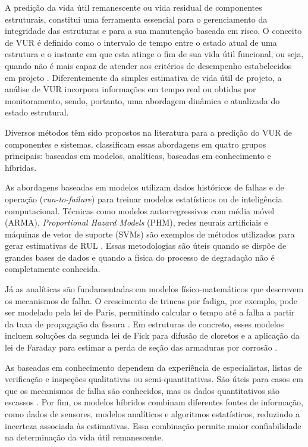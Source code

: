 A predição da vida útil remanescente ou vida residual de componentes estruturais, constitui uma ferramenta essencial para o gerenciamento da integridade das estruturas e para a sua manutenção baseada em risco. O conceito de VUR é definido como o intervalo de tempo entre o estado atual de uma estrutura e o instante em que esta atinge o fim de sua vida útil funcional, ou seja, quando não é mais capaz de atender aos critérios de desempenho estabelecidos em projeto \cite{okoh_overview_2014}. Diferentemente da simples estimativa de vida útil de projeto, a análise de VUR incorpora informações em tempo real ou obtidas por monitoramento, sendo, portanto, uma abordagem dinâmica e atualizada do estado estrutural.

Diversos métodos têm sido propostos na literatura para a predição do VUR de componentes e sistemas. \textcite{okoh_overview_2014} classificam essas abordagens em quatro grupos principais: baseadas em modelos, analíticas, baseadas em conhecimento e híbridas. 

As abordagens baseadas em modelos utilizam dados históricos de falhas e de operação (\textit{run-to-failure}) para treinar modelos estatísticos ou de inteligência computacional. Técnicas como modelos autorregressivos com média móvel (ARMA), \textit{Proportional Hazard Models} (PHM), redes neurais artificiais e máquinas de vetor de suporte (SVMs) são exemplos de métodos utilizados para gerar estimativas de RUL \cite{chen_clustering_1993, you_two-zone_2010}. Essas metodologias são úteis quando se dispõe de grandes bases de dados e quando a física do processo de degradação não é completamente conhecida.

Já as analíticas são fundamentadas em modelos físico-matemáticos que descrevem os mecanismos de falha. O crescimento de trincas por fadiga, por exemplo, pode ser modelado pela lei de Paris, permitindo calcular o tempo até a falha a partir da taxa de propagação da fissura \cite{fatemi_cumulative_1998}. Em estruturas de concreto, esses modelos incluem soluções da segunda lei de Fick para difusão de cloretos e a aplicação da lei de Faraday para estimar a perda de seção das armaduras por corrosão \cite{ortega_assessment_2016}.

As baseadas em conhecimento dependem da experiência de especialistas, listas de verificação e inspeções qualitativas ou semi-quantitativas. São úteis para casos em que os mecanismos de falha são conhecidos, mas os dados quantitativos são escassos \cite{medjaher_remaining_2012} . Por fim, os modelos híbridos combinam diferentes fontes de informação, como dados de sensores, modelos analíticos e algoritmos estatísticos, reduzindo a incerteza associada às estimativas. Essa combinação permite maior confiabilidade na determinação da vida útil remanescente.

